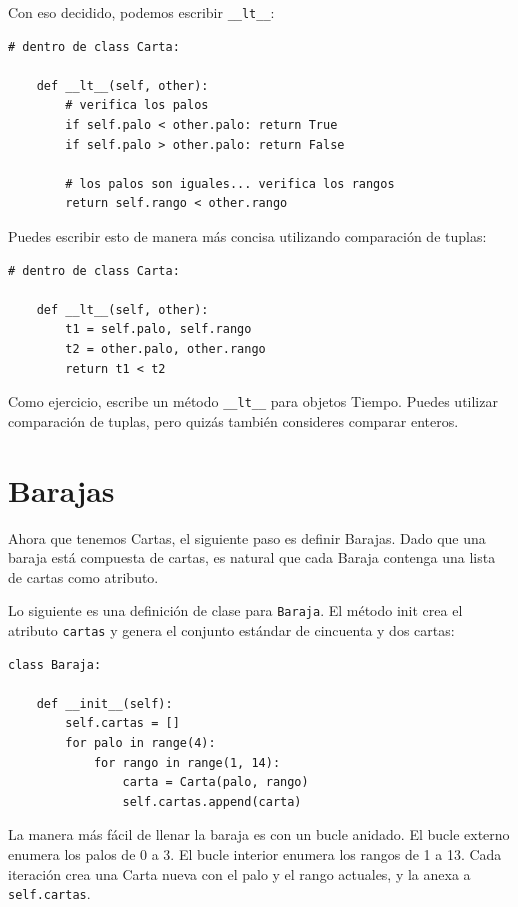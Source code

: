 \documentclass[10pt]{book}
\begin{document}
Con eso decidido, podemos escribir \verb"__lt__":

\begin{verbatim}
# dentro de class Carta:

    def __lt__(self, other):
        # verifica los palos
        if self.palo < other.palo: return True
        if self.palo > other.palo: return False

        # los palos son iguales... verifica los rangos
        return self.rango < other.rango
\end{verbatim}
%
Puedes escribir esto de manera más concisa utilizando comparación de tuplas:

\begin{verbatim}
# dentro de class Carta:

    def __lt__(self, other):
        t1 = self.palo, self.rango
        t2 = other.palo, other.rango
        return t1 < t2
\end{verbatim}
%
Como ejercicio, escribe un método \verb"__lt__" para objetos Tiempo.  Puedes
utilizar comparación de tuplas, pero quizás también consideres
comparar enteros.


\section{Barajas}

Ahora que tenemos Cartas, el siguiente paso es definir Barajas.  Dado que una
baraja está compuesta de cartas, es natural que cada Baraja contenga una
lista de cartas como atributo.


Lo siguiente es una definición de clase para {\tt Baraja}.  El
método init crea el atributo {\tt cartas} y genera
el conjunto estándar de cincuenta y dos cartas:

\begin{verbatim}
class Baraja:

    def __init__(self):
        self.cartas = []
        for palo in range(4):
            for rango in range(1, 14):
                carta = Carta(palo, rango)
                self.cartas.append(carta)
\end{verbatim}
%
La manera más fácil de llenar la baraja es con un bucle anidado.  El bucle externo
enumera los palos de 0 a 3.  El bucle interior enumera los
rangos de 1 a 13.  Cada iteración
crea una Carta nueva con el palo y el rango actuales,
y la anexa a {\tt self.cartas}.
\end{document}
